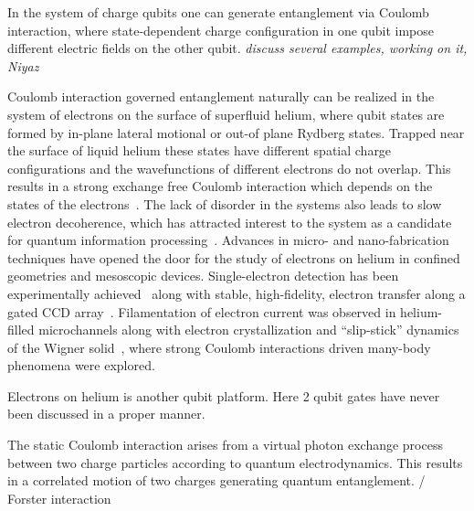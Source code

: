 \documentclass[twocolumn,superscriptaddress,unsortedaddress,
 amsmath,amssymb,
 aps,
]{revtex4-2}
\begin{document}
In the system of charge qubits one can generate entanglement via Coulomb interaction, where state-dependent charge configuration in one qubit impose different electric fields on the other qubit. \textit{discuss several examples, working on it, Niyaz}

Coulomb interaction governed entanglement naturally can be realized in the system of electrons on the surface of superfluid helium, where qubit states are formed by in-plane lateral motional or out-of plane Rydberg states. Trapped near the surface of liquid helium these states have different spatial charge configurations and the wavefunctions of different electrons do not overlap. This results in a strong exchange free Coulomb interaction which depends on the states of the electrons~\cite{dykman2003qubits}. The lack of disorder in the systems also leads to slow electron decoherence, which has attracted interest to the system as a candidate for quantum information processing~\cite{platzman1999quantum,lyon2006spin,schuster2010proposal}. Advances in micro- and nano-fabrication techniques have opened the door for the study of electrons on helium in confined geometries and mesoscopic devices. Single-electron detection has been experimentally achieved~\cite{glasson2005trapping,koolstra2019coupling} along with stable, high-fidelity, electron transfer along a gated CCD array~\cite{bradbury2011efficient}. Filamentation of electron current was observed in helium-filled microchannels along with electron crystallization and ``slip-stick'' dynamics of the Wigner solid~\cite{glasson2001observation,rees2016structural,rees2016stick}, where strong Coulomb interactions driven many-body phenomena were explored.


Electrons on helium is another qubit platform. Here 2 qubit gates have never been discussed in a proper manner.

The static Coulomb interaction arises from a virtual photon exchange process between two charge particles according to quantum electrodynamics. This results in a correlated motion of two charges generating quantum entanglement.
 / Forster interaction
\end{document}
